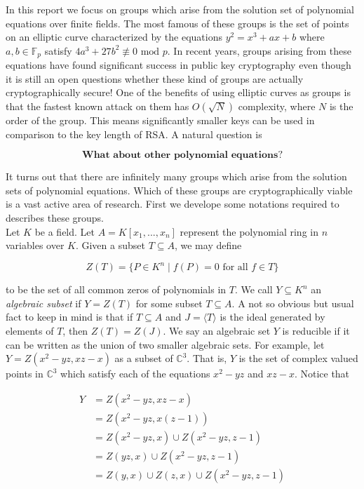 

In this report we focus on groups which arise from the solution set of polynomial equations over finite fields. The most famous of these groups is the set of points on an elliptic curve characterized by the equations $y^2 = x^3 + ax + b$ where $a,b \in \mathbb{F}_p$ satisfy $4a^3 + 27b^2 \not\equiv 0 \text{ mod } p$. In recent years, groups arising from these equations have found significant success in public key cryptography even though it is still an open questions whether these kind of groups are actually cryptographically secure! One of the benefits of using elliptic curves as groups is that the fastest known attack on them has $O(\sqrt{N})$ complexity, where $N$ is the order of the group. This means significantly smaller keys can be used in comparison to the key length of RSA. A natural question is 

$$
\textbf{What about other polynomial equations?}
$$ 

It turns out that there are infinitely many groups which arise from the solution sets of polynomial equations. Which of these groups are cryptographically viable is a vast active area of research. First we develope some notations required to describes these groups. \\ 

Let $K$ be a field. Let $A = K[x_1,...,x_n]$ represent the polynomial ring in $n$ variables over $K$. Given a subset $T \subseteq A$, we may define 

$$
Z(T) = \lbrace P \in K^n \mid f(P) = 0 \text{ for all } f \in T \rbrace 
$$ 

to be the set of all common zeros of polynomials in $T$. We call $Y \subseteq K^n $ an \textit{algebraic subset} if $Y = Z(T)$ for some subset $T \subseteq A$. A not so obvious but usual fact to keep in mind is that if $T \subseteq A$ and $J = \langle T \rangle $ is the ideal generated by elements of $T$, then $Z(T) = Z(J)$. We say an algebraic set $Y$ is reducible if it can be written as the union of two smaller algebraic sets. For example, let $Y = Z(x^2 - yz, xz-x)$ as a subset of $\mathbb{C}^3$. That is, $Y$ is the set of complex valued points in $\mathbb{C}^3$ which satisfy each of the equations $x^2 - yz$ and $xz-x$. Notice that

\begin{align*}
	Y &= Z(x^2 - yz, xz-x) \\
	&= Z(x^2 - yz, x(z-1)) \\
	&= Z(x^2 - yz,x) \cup Z(x^2 - yz,z-1) \\
	&= Z(yz,x) \cup Z(x^2 - yz,z -1) \\
	&= Z(y,x) \cup Z(z,x) \cup Z(x^2 - yz, z - 1)
\end{align*} 

